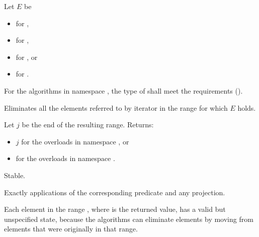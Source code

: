\begin{itemdescr}
\pnum
Let $E$ be
\begin{itemize}
\item {} for ,
\item {} for ,
\item {} for , or
\item {} for .
\end{itemize}

\pnum
\requires
For the algorithms in namespace ,
the type of 
shall meet the  requirements ().

\pnum
\effects
Eliminates all the elements referred to by iterator 
in the range  for which $E$ holds.

\pnum
\returns
Let $j$ be the end of the resulting range. Returns:
\begin{itemize}
\item $j$ for the overloads in namespace , or
\item {} for the overloads in namespace .
\end{itemize}

\pnum
\remarks
Stable.

\pnum
\complexity
Exactly  applications
of the corresponding predicate and any projection.

\pnum
\begin{note}
Each element in the range ,
where  is the returned value,
has a valid but unspecified state,
because the algorithms can eliminate elements
by moving from elements that were originally in that range.
\end{note}
\end{itemdescr}

